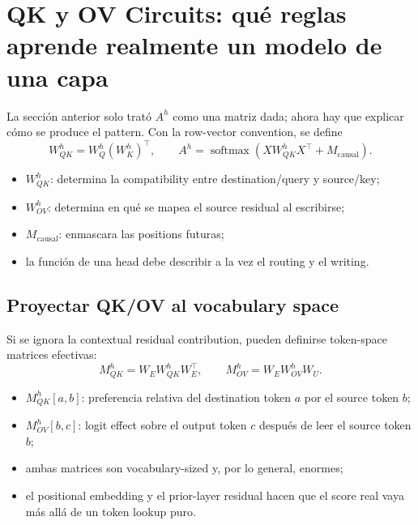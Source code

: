 \section{QK y OV Circuits: qué reglas aprende realmente un modelo de una capa}

La sección anterior solo trató $A^h$ como una matriz dada; ahora hay que explicar cómo se produce el pattern. Con la row-vector convention, se define
\[
W_{QK}^h=W_Q^h(W_K^h)^{\top},
\qquad
A^h=\operatorname{softmax}\!\left(XW_{QK}^hX^{\top}+M_{\mathrm{causal}}\right).
\]

\begin{itemize}
  \item $W_{QK}^h$: determina la compatibility entre destination/query y source/key;
  \item $W_{OV}^h$: determina en qué se mapea el source residual al escribirse;
  \item $M_{\mathrm{causal}}$: enmascara las positions futuras;
  \item la función de una head debe describir a la vez el routing y el writing.
\end{itemize}


\subsection{Proyectar QK/OV al vocabulary space}

Si se ignora la contextual residual contribution, pueden definirse token-space matrices efectivas:
\[
M_{QK}^h=W_EW_{QK}^hW_E^{\top},
\qquad
M_{OV}^h=W_EW_{OV}^hW_U.
\]

\begin{itemize}
  \item $M_{QK}^h[a,b]$: preferencia relativa del destination token $a$ por el source token $b$;
  \item $M_{OV}^h[b,c]$: logit effect sobre el output token $c$ después de leer el source token $b$;
  \item ambas matrices son vocabulary-sized y, por lo general, enormes;
  \item el positional embedding y el prior-layer residual hacen que el score real vaya más allá de un token lookup puro.
\end{itemize}

